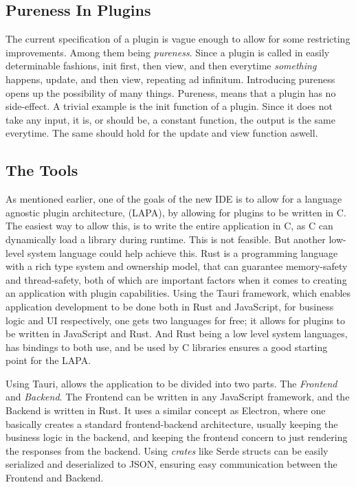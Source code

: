 \documentclass[runningheads]{llncs}
\begin{document}
\subsection{Pureness In Plugins}
The current specification of a plugin is vague enough to allow for some
restricting improvements. Among them being \textit{pureness}. Since a plugin is
called in easily determinable fashions, init first, then view, and then
everytime \textit{something} happens, update, and then view, repeating ad
infinitum. Introducing pureness opens up the possibility of many things.
Pureness, means that a plugin has no side-effect. A trivial example is the init
function of a plugin. Since it does not take any input, it is, or should be, a
constant function, the output is the same everytime. The same should hold for
the update and view function aswell.

\subsection{The Tools}
As mentioned earlier, one of the goals of the new IDE is to allow for a
language agnostic plugin architecture, (LAPA), by allowing for plugins to be
written in C. The easiest way to allow this, is to write the entire application
in C, as C can dynamically load a library during runtime.
This is not feasible. But another low-level system language could help achieve
this. Rust is a programming language with a rich type system and ownership
model, that can guarantee memory-safety and thread-safety, both of which are
important factors when it comes to creating an application with plugin
capabilities. Using the Tauri framework, which enables application development
to be done both in Rust and JavaScript, for business logic and UI respectively,
one gets two languages for free; it allows for plugins to be written in
JavaScript and Rust. And Rust being a low level system languages, has bindings
to both use, and be used by C libraries ensures a good starting point for the
LAPA.


Using Tauri, allows the application to be divided into two parts. The
\textit{Frontend} and \textit{Backend}. The Frontend can be written in any
JavaScript framework, and the Backend is written in Rust. It uses a similar
concept as Electron, %
where one basically creates a standard frontend-backend architecture, usually
keeping the business logic in the backend, and keeping the frontend concern to
just rendering the responses from the backend. Using \textit{crates} like Serde
structs can be easily serialized and deserialized to JSON, ensuring easy
communication between the Frontend and Backend.
\end{document}
